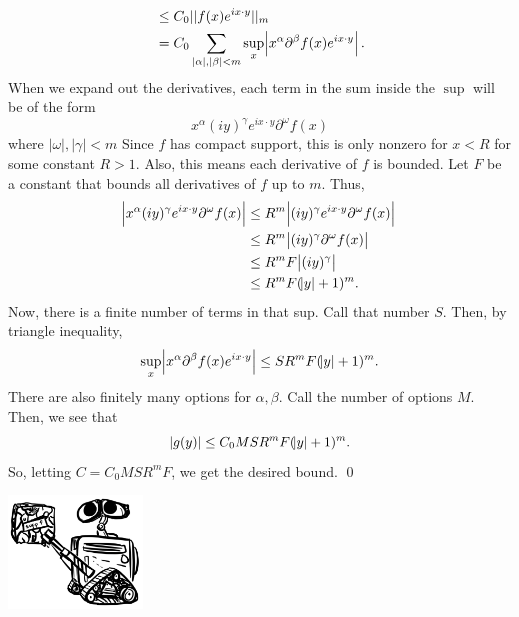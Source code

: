 \documentclass{article}
\renewcommand{\d}{\partial}
\begin{document}
\begin{enumerate}[(a)]
\begin{align*}
        & \le C_0 || f(x)e^{ix \cdot y}||_{m} \\
        &= C_0 \sum_{|\alpha|,|\beta| < m}\sup_x \abs{x^\alpha \d^\beta f(x)e^{ix \cdot y}}.
    \end{align*}
    When we expand out the derivatives, each term in the sum inside the $\sup$ will be of the form 
    \[x^\alpha (iy)^\gamma e^{ix \cdot y} \d^\omega f(x)\]
    where $|\omega|, |\gamma| < m$ Since $f$ has compact support, this is only nonzero for $x < R$ for some constant $R > 1$. Also, this means each derivative of $f$ is bounded. Let $F$ be a constant that bounds all derivatives of $f$ up to $m$. Thus, 
    \begin{align*}
        \abs{x^\alpha (iy)^\gamma e^{ix \cdot y} \d^\omega f(x)} &\le R^m \abs{ (iy)^\gamma e^{ix \cdot y} \d^\omega f(x)}\\
        &\le R^m \abs{ (iy)^\gamma\d^\omega f(x)}\\
        &\le R^m F \abs{ (iy)^\gamma}\\
        &\le R^m F (\abs{y}+1)^m.
    \end{align*}
    Now, there is a finite number of terms in that sup. Call that number $S$. Then, by triangle inequality,
    \[\sup_x \abs{x^\alpha \d^\beta f(x)e^{ix \cdot y}} \le S R^m F (\abs{y}+1)^m.\]
    There are also finitely many options for $\alpha, \beta$. Call the number of options $M$. Then, we see that 
    \[|g(y)| \le C_0 M S R^m F (\abs{y}+1)^m .\]
    So, letting $C = C_0 M S R^m F$, we get the desired bound. \qed
\end{enumerate}
\begin{center}
    \includegraphics[height=3cm]{../images/suppf}
\end{center}
\end{document}
